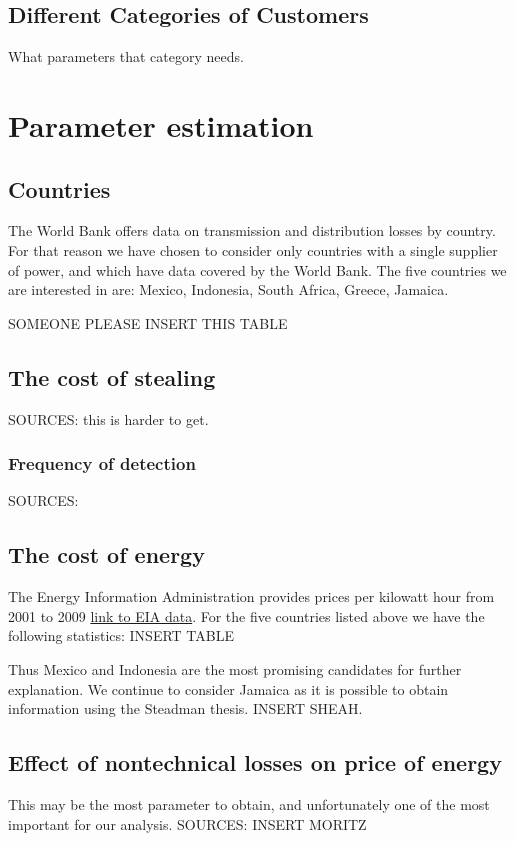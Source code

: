 \documentclass{article}
\begin{document}
\subsection{Different Categories of Customers}
What parameters that category needs. 

\section{Parameter estimation}

\subsection{Countries}
The World Bank offers data on transmission and distribution losses by country. For that reason we have chosen to consider only countries with a single supplier of power, and which have data covered by the World Bank.  The five countries we are interested in are: Mexico, Indonesia, South Africa, Greece, Jamaica. 

SOMEONE PLEASE INSERT THIS TABLE 
\subsection{The cost of stealing}
SOURCES:  this is harder to get. 
\subsubsection{Frequency of detection}
SOURCES: 
\subsection{The cost of energy}
The Energy Information Administration provides prices per kilowatt hour from 2001 to 2009 \href{http://www.eia.gov/countries/prices/electricity_households.cfm}{ link to EIA data}. For the five countries listed above we have the following statistics: 
INSERT TABLE 

Thus Mexico and Indonesia are the most promising candidates for further explanation. We continue to consider Jamaica as it is possible to obtain information using the Steadman thesis. INSERT SHEAH. 
 
\subsection{Effect of nontechnical losses on price of energy}
This may be the most parameter to obtain, and unfortunately one of the most important for our analysis. 
SOURCES: INSERT MORITZ
\end{document}
